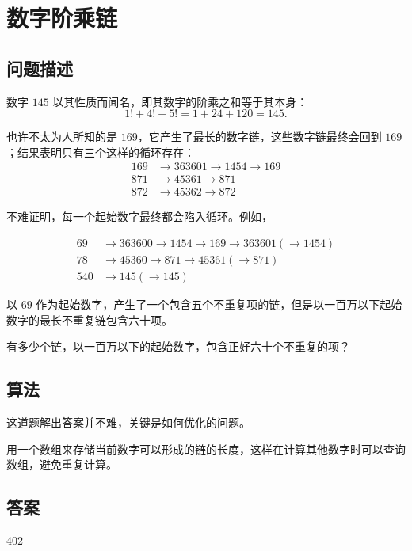 \section{数字阶乘链}
\subsection{问题描述}
\begin{tcolorbox}

	数字 $145$ 以其性质而闻名，即其数字的阶乘之和等于其本身：
	\[1! + 4! + 5! = 1 + 24 + 120 = 145.\]

	也许不太为人所知的是 $169$，它产生了最长的数字链，这些数字链最终会回到 $169$；结果表明只有三个这样的循环存在：
	\begin{align*}
		169 & \rightarrow 363601 \rightarrow 1454 \rightarrow 169 \\
		871 & \rightarrow 45361 \rightarrow 871                   \\
		872 & \rightarrow 45362 \rightarrow 872
	\end{align*}

	不难证明，每一个起始数字最终都会陷入循环。例如，

	\begin{align*}
		69  & \rightarrow 363600 \rightarrow 1454 \rightarrow 169 \rightarrow 363601 (\rightarrow 1454) \\
		78  & \rightarrow 45360 \rightarrow 871 \rightarrow 45361 (\rightarrow 871)                     \\
		540 & \rightarrow 145 (\rightarrow 145)
	\end{align*}

	以 $69$ 作为起始数字，产生了一个包含五个不重复项的链，但是以一百万以下起始数字的最长不重复链包含六十项。

	有多少个链，以一百万以下的起始数字，包含正好六十个不重复的项？
\end{tcolorbox}

\subsection{算法}
这道题解出答案并不难，关键是如何优化的问题。

用一个数组来存储当前数字可以形成的链的长度，这样在计算其他数字时可以查询数组，避免重复计算。

\subsection{答案}
402
